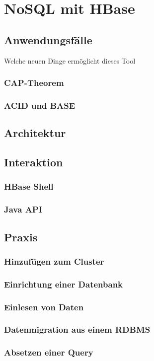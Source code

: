 \chapter{NoSQL mit HBase}
\section{Anwendungsfälle}
Welche neuen Dinge ermöglicht dieses Tool
\subsection{CAP-Theorem}
\subsection{ACID und BASE}
\section{Architektur}
\section{Interaktion}
\subsection{HBase Shell}
\subsection{Java API}
\section{Praxis}
\subsection{Hinzufügen zum Cluster}
\subsection{Einrichtung einer Datenbank}
\subsection{Einlesen von Daten}
\subsection{Datenmigration aus einem RDBMS}
\subsection{Absetzen einer Query}